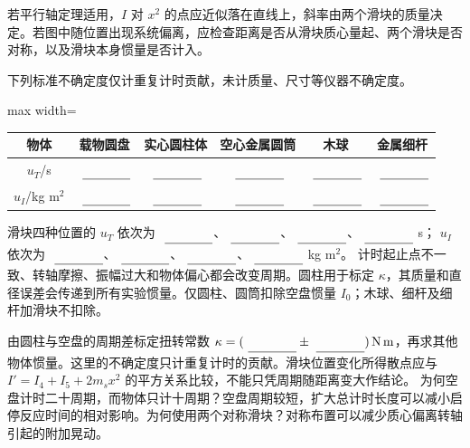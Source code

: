 若平行轴定理适用，$I$ 对 $x^2$ 的点应近似落在直线上，斜率由两个滑块的质量决定。若图中随位置出现系统偏离，应检查距离是否从滑块质心量起、两个滑块是否对称，以及滑块本身惯量是否计入。\par
{}
下列标准不确定度仅计重复计时贡献，未计质量、尺寸等仪器不确定度。
\begin{center}\small\begin{adjustbox}{max width=\textwidth}
\begin{tabular}{|c|c|c|c|c|c|}\hline
物体 & 载物圆盘 & 实心圆柱体 & 空心金属圆筒 & 木球 & 金属细杆\\\hline
$u_T$/s & $\MathField{period_disk_u}$ & $\MathField{period_cylinder_u}$ & $\MathField{period_tube_u}$ & $\MathField{period_ball_u}$ & $\MathField{period_rod_u}$\\\hline
$u_I$/kg m$^2$ & $\MathField{empty_inertia_u}$ & $\MathField{experiment_cylinder_u}$ & $\MathField{experiment_tube_u}$ & $\MathField{experiment_ball_u}$ & $\MathField{experiment_rod_u}$\\\hline
\end{tabular}\end{adjustbox}\end{center}
滑块四种位置的 $u_T$ 依次为
$\MathField{slider_period_5_u}$、$\MathField{slider_period_10_u}$、$\MathField{slider_period_15_u}$、$\MathField{slider_period_20_u}$ s；
$u_I$ 依次为 $\MathField{slider_experiment_5_u}$、$\MathField{slider_experiment_10_u}$、$\MathField{slider_experiment_15_u}$、$\MathField{slider_experiment_20_u}$ kg m$^2$。
计时起止点不一致、转轴摩擦、振幅过大和物体偏心都会改变周期。圆柱用于标定 $\kappa$，其质量和直径误差会传递到所有实验惯量。仅圆柱、圆筒扣除空盘惯量 $I_0$；木球、细杆及细杆加滑块不扣除。\par
{}
由圆柱与空盘的周期差标定扭转常数 $\kappa=(\MathField{torsion_constant}\pm\MathField{torsion_constant_u})\,\mathrm{N\,m}$，再求其他物体惯量。这里的不确定度只计重复计时的贡献。滑块位置变化所得散点应与 $I'=I_4+I_5+2m_sx^2$ 的平方关系比较，不能只凭周期随距离变大作结论。
为何空盘计时二十周期，而物体只计十周期？空盘周期较短，扩大总计时长度可以减小启停反应时间的相对影响。为何使用两个对称滑块？对称布置可以减少质心偏离转轴引起的附加晃动。

\ReportRecord

